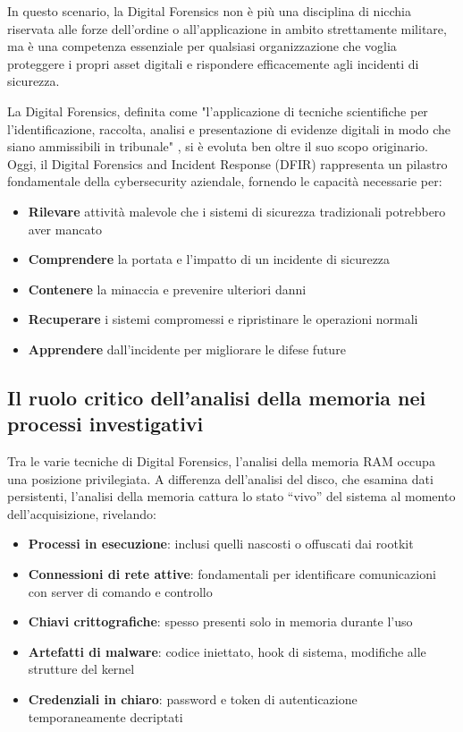 In questo scenario, la Digital Forensics non è più una disciplina di nicchia riservata alle forze dell'ordine o all'applicazione in ambito strettamente militare, ma è una competenza essenziale per qualsiasi organizzazione che voglia proteggere i propri asset digitali e rispondere efficacemente agli incidenti di sicurezza.

La Digital Forensics, definita come "l'applicazione di tecniche scientifiche per l'identificazione, raccolta, analisi e presentazione di evidenze digitali in modo che siano ammissibili in tribunale" \cite{palmer2001}, si è evoluta ben oltre il suo scopo originario. Oggi, il Digital Forensics and Incident Response (DFIR) rappresenta un pilastro fondamentale della cybersecurity aziendale, fornendo le capacità necessarie per:

\begin{itemize}
   \item \textbf{Rilevare} attività malevole che i sistemi di sicurezza tradizionali potrebbero aver mancato
   \item \textbf{Comprendere} la portata e l'impatto di un incidente di sicurezza
   \item \textbf{Contenere} la minaccia e prevenire ulteriori danni
   \item \textbf{Recuperare} i sistemi compromessi e ripristinare le operazioni normali
   \item \textbf{Apprendere} dall'incidente per migliorare le difese future
\end{itemize}

\subsection{Il ruolo critico dell'analisi della memoria nei processi investigativi}

Tra le varie tecniche di Digital Forensics, l'analisi della memoria RAM occupa una posizione privilegiata. A differenza dell'analisi del disco, che esamina dati persistenti, l'analisi della memoria cattura lo stato ``vivo'' del sistema al momento dell'acquisizione, rivelando:

\begin{itemize}
   \item \textbf{Processi in esecuzione}: inclusi quelli nascosti o offuscati dai rootkit
   \item \textbf{Connessioni di rete attive}: fondamentali per identificare comunicazioni con server di comando e controllo
   \item \textbf{Chiavi crittografiche}: spesso presenti solo in memoria durante l'uso
   \item \textbf{Artefatti di malware}: codice iniettato, hook di sistema, modifiche alle strutture del kernel
   \item \textbf{Credenziali in chiaro}: password e token di autenticazione temporaneamente decriptati
\end{itemize}

